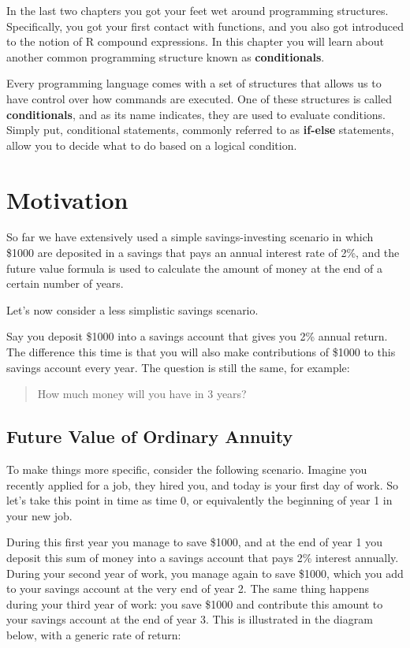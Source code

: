 \documentclass[
]{book}
\begin{document}
In the last two chapters you got your feet wet around programming structures.
Specifically, you got your first contact with functions, and you also got
introduced to the notion of R compound expressions. In this chapter you will
learn about another common programming structure known as \textbf{conditionals}.

Every programming language comes with a set of structures that allows us to
have control over how commands are executed. One of these structures is called
\textbf{conditionals}, and as its name indicates, they are used to evaluate
conditions. Simply put, conditional statements, commonly referred to as
\textbf{if-else} statements, allow you to decide what to do based on a logical
condition.

\hypertarget{motivation-2}{%
\section{Motivation}\label{motivation-2}}

So far we have extensively used a simple savings-investing scenario in which
\$1000 are deposited in a savings that pays an annual interest rate of 2\%,
and the future value formula is used to calculate the amount of money at the
end of a certain number of years.

Let's now consider a less simplistic savings scenario.

Say you deposit \$1000 into a savings account that gives you 2\% annual return.
The difference this time is that you will also make contributions of \$1000 to
this savings account every year. The question is still the same, for example:

\begin{quote}
How much money will you have in 3 years?
\end{quote}

\hypertarget{future-value-of-ordinary-annuity}{%
\subsection{Future Value of Ordinary Annuity}\label{future-value-of-ordinary-annuity}}

To make things more specific, consider the following scenario. Imagine you
recently applied for a job, they hired you, and today is your first day of work.
So let's take this point in time as time 0, or equivalently the beginning of
year 1 in your new job.

During this first year you manage to save \$1000, and at the end of year 1 you
deposit this sum of money into a savings account that pays 2\% interest annually.
During your second year of work, you manage again to save \$1000, which you
add to your savings account at the very end of year 2. The same thing happens
during your third year of work: you save \$1000 and contribute this amount to
your savings account at the end of year 3. This is illustrated in the
diagram below, with a generic rate of return:
\end{document}
